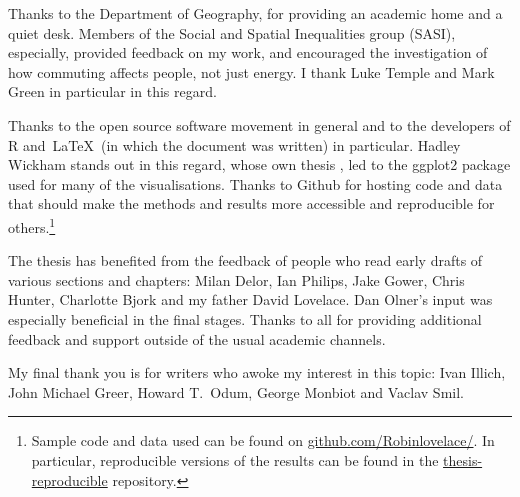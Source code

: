 \documentclass[a4paper, 11pt, twoside]{Thesis}  %
\begin{document}
{Thanks to the Department of Geography, for providing an academic
home and a quiet desk. Members of the Social
and Spatial Inequalities group (SASI), especially, provided
feedback on my work, and encouraged the investigation of
how commuting affects people, not just energy. I thank Luke Temple and Mark
Green in particular in this regard.

Thanks to the open source software movement in general and to the developers
of R and~\LaTeX~(in which the document was written) in particular.
Hadley Wickham stands out in this
regard, whose own thesis \citep{Wickham2008}, led to the ggplot2 package
used for many of the visualisations.
Thanks to Github for hosting code and data that should make the methods
and results more accessible and reproducible for
others.\footnote{Sample code
and data used can be found on {\color{blue} \href{https://github.com/Robinlovelace/}
{github.com/Robinlovelace/}}. In particular, reproducible versions of
the results can be found in the {\color{blue} \href{https://github.com/Robinlovelace/thesis-reproducible}
{thesis-reproducible}} repository. }

The thesis has benefited from the feedback of people who read 
early drafts of various sections and chapters: Milan Delor,
Ian Philips, Jake Gower, Chris Hunter, Charlotte Bjork and my father 
David Lovelace. Dan Olner's input was especially beneficial in the final 
stages. Thanks to all for providing additional feedback and support outside
of the usual academic channels.

My final thank you is for writers who awoke my interest in this topic: Ivan
Illich, John Michael Greer, Howard T.~Odum, George Monbiot and
Vaclav Smil.
}
\clearpage  %
\end{document}
